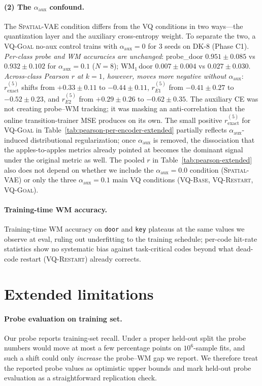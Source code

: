 \documentclass{article}
\newcommand{\encVQBase}{\textsc{VQ-Base}}
\newcommand{\encVQRestart}{\textsc{VQ-Restart}}
\newcommand{\encVQGoal}{\textsc{VQ-Goal}}
\newcommand{\encSpatialVAE}{\textsc{Spatial-VAE}}
\begin{document}
\paragraph{(2) The $\alpha_{\text{aux}}$ confound.}
The \encSpatialVAE{} condition differs from the VQ conditions in two ways---the quantization layer and the auxiliary cross-entropy weight. To separate the two, a \encVQGoal{} no-aux control trains with $\alpha_{\text{aux}}{=}0$ for 3 seeds on DK-8 (Phase C1). \emph{Per-class probe and WM accuracies are unchanged}: probe\_door $0.951\pm0.085$ vs $0.932\pm0.102$ for $\alpha_{\text{aux}}{=}0.1$ ($N{=}8$); WM$_1$\,door $0.007\pm0.004$ vs $0.027\pm0.030$. \emph{Across-class Pearson $r$ at $k{=}1$, however, moves more negative without $\alpha_{\text{aux}}$}: $r_{\text{exact}}^{(5)}$ shifts from $+0.33\pm0.11$ to $-0.44\pm0.11$, $r_{E1}^{(5)}$ from $-0.41\pm0.27$ to $-0.52\pm0.23$, and $r_{E2}^{(5)}$ from $+0.29\pm0.26$ to $-0.62\pm0.35$. The auxiliary CE was not creating probe--WM tracking; it was masking an anti-correlation that the online transition-trainer MSE produces on its own. The small positive $r_{\text{exact}}^{(5)}$ for \encVQGoal{} in Table~\ref{tab:pearson-per-encoder-extended} partially reflects $\alpha_{\text{aux}}$-induced distributional regularization; once $\alpha_{\text{aux}}$ is removed, the dissociation that the apples-to-apples metrics already pointed at becomes the dominant signal under the original metric as well. The pooled $r$ in Table~\ref{tab:pearson-extended} also does not depend on whether we include the $\alpha_{\text{aux}}{=}0.0$ condition (\encSpatialVAE{}) or only the three $\alpha_{\text{aux}}{=}0.1$ main VQ conditions (\encVQBase{}, \encVQRestart{}, \encVQGoal{}).

\paragraph{Training-time WM accuracy.}
Training-time WM accuracy on \texttt{door} and \texttt{key} plateaus at the same values we observe at eval, ruling out underfitting to the training schedule; per-code hit-rate statistics show no systematic bias against task-critical codes beyond what dead-code restart (\encVQRestart{}) already corrects.

\section{Extended limitations}\label{app:limitations}

\paragraph{Probe evaluation on training set.}
Our probe reports training-set recall. Under a proper held-out split the probe numbers would move at most a few percentage points on $10^6$-sample fits, and such a shift could only \emph{increase} the probe--WM gap we report. We therefore treat the reported probe values as optimistic upper bounds and mark held-out probe evaluation as a straightforward replication check.
\end{document}
